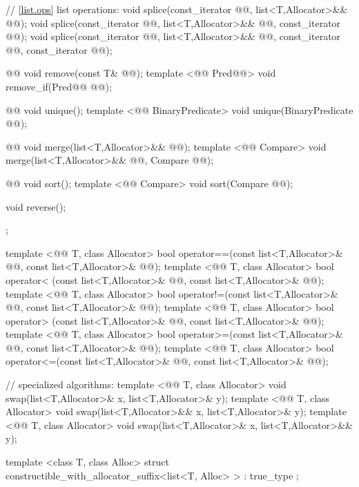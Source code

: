 \documentclass[american,twoside]{book}
\begin{document}
\begin{codeblock}
{{    // \ref{list.ops} list operations:
    void splice(const_iterator @@, list<T,Allocator>&& @@);
    void splice(const_iterator @@, list<T,Allocator>&& @@, const_iterator @@);
    void splice(const_iterator @@, list<T,Allocator>&& @@,
                const_iterator @@, const_iterator @@);

    @@ void remove(const T& @@);
    template <@@ Pred@@> void remove_if(Pred@@ @@);

    @@ void unique();
    template <@@ BinaryPredicate>
      void unique(BinaryPredicate @@);

    @@ void merge(list<T,Allocator>&& @@);
    template <@@ Compare> 
      void merge(list<T,Allocator>&& @@, Compare @@);

    @@ void sort();
    template <@@ Compare> void sort(Compare @@);

    void reverse();
  };

  template <@@ T, class Allocator>
    bool operator==(const list<T,Allocator>& @@, const list<T,Allocator>& @@);
  template <@@ T, class Allocator>
    bool operator< (const list<T,Allocator>& @@, const list<T,Allocator>& @@);
  template <@@ T, class Allocator>
    bool operator!=(const list<T,Allocator>& @@, const list<T,Allocator>& @@);
  template <@@ T, class Allocator>
    bool operator> (const list<T,Allocator>& @@, const list<T,Allocator>& @@);
  template <@@ T, class Allocator>
    bool operator>=(const list<T,Allocator>& @@, const list<T,Allocator>& @@);
  template <@@ T, class Allocator>
    bool operator<=(const list<T,Allocator>& @@, const list<T,Allocator>& @@);

  // specialized algorithms:
  template <@@ T, class Allocator>
    void swap(list<T,Allocator>& x, list<T,Allocator>& y);
  template <@@ T, class Allocator>
    void swap(list<T,Allocator>&& x, list<T,Allocator>& y);
  template <@@ T, class Allocator>
    void swap(list<T,Allocator>& x, list<T,Allocator>&& y);

  template <class T, class Alloc>
    struct constructible_with_allocator_suffix<list<T, Alloc> >
      : true_type { };
}
\end{codeblock}
\end{document}
